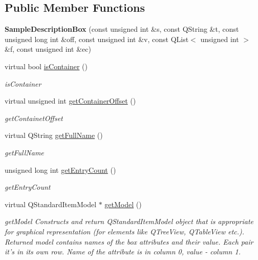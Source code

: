 \subsection*{Public Member Functions}
\begin{DoxyCompactItemize}
\item 
\hypertarget{class_sample_description_box_a1e86740d77aa46a58f230f9d20f08975}{{\bfseries Sample\-Description\-Box} (const unsigned int \&s, const Q\-String \&t, const unsigned long int \&off, const unsigned int \&v, const Q\-List$<$ unsigned int $>$ \&f, const unsigned int \&ec)}\label{class_sample_description_box_a1e86740d77aa46a58f230f9d20f08975}

\item 
virtual bool \hyperlink{class_sample_description_box_a227a7ad2f2d282a14cdbbed065fecfa5}{is\-Container} ()
\begin{DoxyCompactList}\small\item\em is\-Container \end{DoxyCompactList}\item 
virtual unsigned int \hyperlink{class_sample_description_box_af2fa7d915484805e19abf46f40e906f6}{get\-Container\-Offset} ()
\begin{DoxyCompactList}\small\item\em get\-Containet\-Offset \end{DoxyCompactList}\item 
virtual Q\-String \hyperlink{class_sample_description_box_a47754fb62da6522d13ff58de1ede0f09}{get\-Full\-Name} ()
\begin{DoxyCompactList}\small\item\em get\-Full\-Name \end{DoxyCompactList}\item 
unsigned long int \hyperlink{class_sample_description_box_a2581cd57076984fef7051c792eff1b50}{get\-Entry\-Count} ()
\begin{DoxyCompactList}\small\item\em get\-Entry\-Count \end{DoxyCompactList}\item 
virtual Q\-Standard\-Item\-Model $\ast$ \hyperlink{class_sample_description_box_ae00adf8e73a8480b7299a88d9d65d88a}{get\-Model} ()
\begin{DoxyCompactList}\small\item\em get\-Model Constructs and return Q\-Standard\-Item\-Model object that is appropriate for graphical representation (for elements like Q\-Tree\-View, Q\-Table\-View etc.). Returned model contains names of the box attributes and their value. Each pair it's in its own row. Name of the attribute is in column 0, value -\/ column 1. \end{DoxyCompactList}\end{DoxyCompactItemize}
